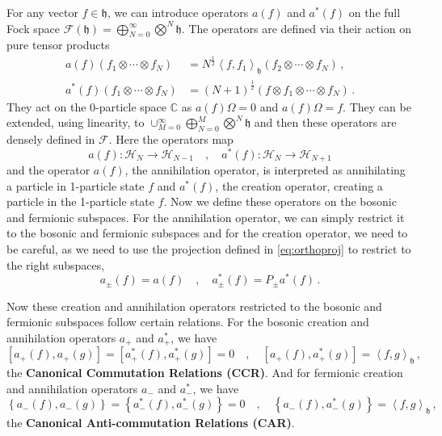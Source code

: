 \documentclass[12pt,a4paper]{article}
\numberwithin{equation}{section}
\newcommand{\1}{\mathbb{I}}
\newcommand{\C}{\mathbb{C}}
\newcommand{\h}{\mathfrak{h}}
\newcommand{\HH}{\mathcal{H}}
\newcommand{\FF}{\mathcal{F}}
\newcommand{\half}{\frac{1}{2}}
\newcommand{\eva}[1]{\left\langle #1 \right\rangle}
\theoremstyle{plain}
\theoremstyle{definition}
\theoremstyle{remark}
\theoremstyle{plain}
\theoremstyle{definition}
\theoremstyle{remark}
\begin{document}
For any vector $f \in \h$, we can introduce operators $a(f)$ and $a^*(f)$ on the full Fock space $\FF(\h) = \bigoplus_{N=0}^{\infty}\bigotimes^{N} \h$. The operators are defined via their action on pure tensor products
\begin{align}
	a(f)\left(f_1\otimes\cdots\otimes f_N\right) &= N^{\half}\eva{f,f_1}_{\h}\left(f_2\otimes\cdots\otimes f_N\right) \,,\\
	a^*(f)\left(f_1\otimes\cdots\otimes f_N\right) &= (N+1)^{\half}\left(f\otimes f_1\otimes\cdots\otimes f_N\right)\,.
\end{align}
They act on the 0-particle space $\C$ as $a(f)\Omega=0$ and $a(f)\Omega= f$. They can be extended, using linearity, to $\cup_{M=0}^{\infty}\bigoplus_{N=0}^{M}\bigotimes^{N} \h$ and then these operators are densely defined in $\FF$. Here the operators map 
\begin{equation}
	a(f):\HH_N \rightarrow\HH_{N-1} \quad,\quad a^*(f):\HH_{N} \rightarrow\HH_{N+1}
\end{equation} and the operator $a(f)$, the annihilation operator, is interpreted as annihilating a particle in 1-particle state $f$ and $a^*(f)$, the creation operator, creating a particle in the 1-particle state $f$. Now we define these operators on the bosonic and fermionic subspaces. For the annihilation operator, we can simply restrict it to the bosonic and fermionic subspaces and for the creation operator, we need to be careful, as we need to use the projection defined in \eqref{eq:orthoproj} to restrict to the right subspaces,
\begin{equation}
	a_{\pm}(f) = a(f) \quad, \quad a^*_{\pm}(f) = P_{\pm}a^*(f)\,.
\end{equation}
    
Now these creation and annihilation operators restricted to the bosonic and fermionic subspaces follow certain relations.
For the bosonic creation and annihilation operators $a_{+}$ and $a^*_{+}$, we have 
\begin{equation}\label{eq:ccr}
	\left[a_{+}(f),a_{+}(g)\right] = \left[a^*_{+}(f),a^*_{+}(g)\right]= 0  \quad, \quad \left[a_{+}(f),a^*_{+}(g)\right] = \eva{f,g}_{\h}\,,
\end{equation}
the \textbf{Canonical Commutation Relations (CCR)}. And for fermionic creation and annihilation operators $a_{-}$ and $a^*_{-}$, we have 
\begin{equation}\label{eq:car}
	\left\{a_{-}(f),a_{-}(g)\right\} = \left\{a^*_{-}(f),a^*_{-}(g)\right\}= 0  \quad, \quad \left\{a_{-}(f),a^*_{-}(g)\right\} = \eva{f,g}_{\h}\,,
\end{equation}
the \textbf{Canonical Anti-commutation Relations (CAR)}.
\end{document}
